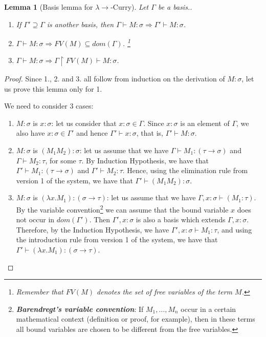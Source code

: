 \documentclass{llncs}
\newcommand{\lambdasystem}[0]{{\lambda}{\rightarrow}}
\newcommand{\myemph}[1]{\textbf{\emph{#1}}}
\theoremstyle{definition}
\numberwithin{mydef}{subsection}
\theoremstyle{plain}
\newtheorem{mylm}[mydef]{Lemma}
\theoremstyle{remark}
\begin{document}
	\begin{mylm}[Basis lemma for $\lambdasystem$-Curry]\label{lm:basis-curry}
		Let $\Gamma$ be a basis..
		\begin{enumerate}
			\item If $\Gamma ' \supseteq \Gamma$ is another basis, then $\Gamma \vdash M : \sigma \Rightarrow \Gamma ' \vdash M : \sigma$.
			\item $\Gamma \vdash M : \sigma \Rightarrow FV {\left( M \right)} \subseteq dom {\left( \Gamma \right)}$. \footnote{Remember that $FV {\left( M \right)}$ denotes the set of free variables of the term $M$.}
			\item $\Gamma \vdash M : \sigma \Rightarrow \Gamma \upharpoonright FV {\left( M \right)} \vdash M : \sigma$.
		\end{enumerate}
	\end{mylm}
	\begin{proof}
		Since 1., 2. and 3. all follow from induction on the derivation of $M : \sigma$, let us prove this lemma only for 1.
		
		We need to consider 3 cases:
		\begin{enumerate}
			\item $M : \sigma$ is $x : \sigma$: let us consider that $x : \sigma \in \Gamma$. Since $x : \sigma$ is an element of $\Gamma$, we also have $x : \sigma \in \Gamma '$ and hence $\Gamma ' \vdash x : \sigma$, that is, $\Gamma ' \vdash M : \sigma$.
			\item $M : \sigma$ is $\left( M _{1} M _{2} \right) : \sigma$: let us assume that we have $\Gamma \vdash M _{1} : \left( \tau \rightarrow \sigma \right)$ and $\Gamma \vdash M _{2} : \tau$, for some $\tau$. By Induction Hypothesis, we have that $\Gamma ' \vdash M _{1} : \left( \tau \rightarrow \sigma \right)$ and $\Gamma ' \vdash M _{2} : \tau$. Hence, using the elimination rule from version 1 of the system, we have that $\Gamma ' \vdash \left( M _{1} M _{2} \right) : \sigma $.
			\item $M : \sigma$ is $\left( \lambda x . M _{1} \right) : \left( \sigma \rightarrow \tau \right)$: let us assume that we have $\Gamma, x : \sigma \vdash \left( M _{1} : \tau \right)$. By the variable convention\footnote{\myemph{Barendregt's variable convention}: If $M _{1}, \dots, M _{n}$ occur in a certain mathematical context (definition or proof, for example), then in these terms all bound variables are chosen to be different from the free variables.} we can assume that the bound variable $x$ does not occur in $dom {\left( \Gamma ' \right)}$. Then $\Gamma ' , x : \sigma$ is also a basis which extends $\Gamma , x : \sigma$. Therefore, by the Induction Hypothesis, we have $\Gamma ' , x : \sigma \vdash M _{1} : \tau$, and using the introduction rule from version 1 of the system, we have that $\Gamma ' \vdash \left( \lambda x . M _{1} \right) : \left( \sigma \rightarrow \tau \right)$.
		\end{enumerate}
	\end{proof}
	
\end{document}
